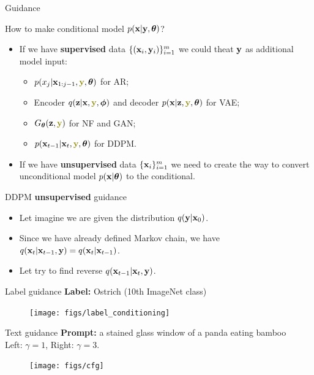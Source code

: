 \begin{frame}{Guidance}
	\begin{block}{How to make conditional model $p(\mathbf{x} | \mathbf{y}, \boldsymbol{\theta})$?}
		\begin{itemize}
		\item If we have \textbf{supervised} data $\{(\mathbf{x}_i, \mathbf{y}_i)\}_{i=1}^m$ we could theat $\mathbf{y}$ as additional model input:
		\begin{itemize}
			\item $p(x_j | \bx_{1:j-1}, {\color{olive}\by}, \btheta)$ for AR;
			\item Encoder $q(\bz | \bx, {\color{olive}\by}, \bphi)$ and decoder $p(\bx | \bz, {\color{olive}\by}, \btheta)$ for VAE;
			\item $G_{\btheta}(\bz, {\color{olive}\by})$ for NF and GAN;
			\item $p(\bx_{t-1} | \bx_t, {\color{olive}\by}, \btheta)$ for DDPM.
		\end{itemize}
		\item If we have \textbf{unsupervised} data $\{\mathbf{x}_i\}_{i=1}^m$ we need to create the way to convert unconditional model $p(\mathbf{x} | \boldsymbol{\theta})$ to the conditional.
		\end{itemize}
	\end{block}
	\begin{block}{DDPM \textbf{unsupervised} guidance}
		\begin{itemize}
			\item Let imagine we are given the distribution $q(\mathbf{y} | \mathbf{x}_0)$. 
			\item Since we have already defined Markov chain, we have $q(\mathbf{x}_t | \mathbf{x}_{t-1}, \mathbf{y}) = q(\mathbf{x}_t | \mathbf{x}_{t - 1})$.
			\item Let try to find reverse $q(\mathbf{x}_{t-1} | \mathbf{x}_t, \mathbf{y})$.
		\end{itemize}
	\end{block}
\end{frame}
\begin{frame}{Label guidance}
	\textbf{Label:} Ostrich (10th ImageNet class) 
	\begin{figure}
		\texttt{[image: figs/label\_conditioning]}
	\end{figure}
	\end{frame}
\begin{frame}{Text guidance}
	\textbf{Prompt:} a stained glass window of a panda eating bamboo \\
	Left: $\gamma = 1$, Right: $\gamma = 3$.
	\begin{figure}
		\texttt{[image: figs/cfg]}
	\end{figure}
\end{frame}
